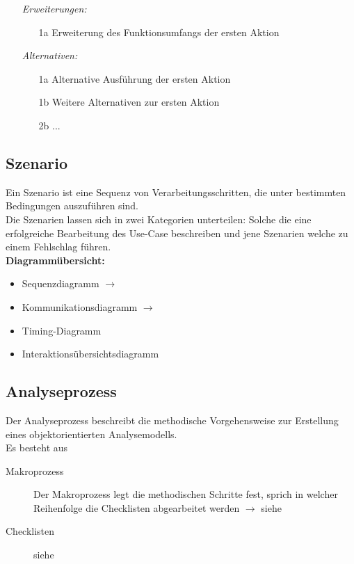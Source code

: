 \begin{description}[leftmargin=2.5cm]
\begin{itemize}[leftmargin=4.5cm]
        \item[\textit{Erweiterungen:}]
          \begin{enumerate}[leftmargin=0.5cm]
            \item[1a] Erweiterung des Funktionsumfangs der ersten Aktion
          \end{enumerate}
        \item[\textit{Alternativen:}]
          \begin{enumerate}[leftmargin=0.5cm]
            \item[1a] Alternative Ausführung der ersten Aktion
            \item[1b] Weitere Alternativen zur ersten Aktion
            \item[2b] ...
          \end{enumerate}
      \end{itemize}
	\end{description}

	\subsection{Szenario }
  		Ein Szenario ist eine Sequenz von Verarbeitungsschritten, die unter bestimmten
  		Bedingungen auszuführen sind.\\
  		Die Szenarien lassen sich in zwei Kategorien unterteilen: Solche die eine erfolgreiche Bearbeitung
  des Use-Case beschreiben und jene Szenarien welche zu einem Fehlschlag führen. \\
  
  \textbf{Diagrammübersicht:}
  \begin{multicols}{2}
  	\begin{itemize}[leftmargin=0.5cm]
    	\item Sequenzdiagramm $\rightarrow$ 
    	\item Kommunikationsdiagramm $\rightarrow$ 
    	\item Timing-Diagramm
    	\item Interaktionsübersichtsdiagramm
  	\end{itemize}
  \end{multicols}
  
\subsection{Analyseprozess }
  Der Analyseprozess beschreibt die methodische Vorgehensweise zur Erstellung eines objektorientierten Analysemodells.\\
  
  Es besteht aus
  \begin{description}
    \item[Makroprozess]
      Der Makroprozess legt die methodischen Schritte fest, sprich in welcher
      Reihenfolge die Checklisten abgearbeitet werden $\rightarrow$ siehe 
    \item[Checklisten]
      siehe 
  \end{description}
  